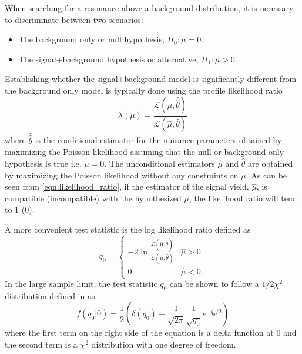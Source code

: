 When searching for a resonance above a background distribution, it is 
necessary to discriminate between two scenarios:
\begin{itemize}
    \item The background only or null hypothesis, $H_{0}: \mu = 0$.
    \item The signal+background hypothesis or alternative, $H_{1}: \mu > 0$.
\end{itemize}
Establishing whether the signal+background model is significantly different 
from the background only model is typically done using the profile likelihood
ratio
\begin{equation}
    \lambda(\mu) = \frac{\mathcal{L}(\mu, \hat{\hat{\theta}})}{\mathcal{L}(\hat{\mu}, \hat{\theta})}
    \label{eqn:likelihood_ratio}
\end{equation}
where $\hat{\hat{\theta}}$ is the conditional estimator for the nuisance parameters 
obtained by maximizing the Poisson likelihood assuming that the null or 
background only hypothesis is true i.e. $\mu = 0$. The unconditional estimators $\hat{\mu}$ 
and $\hat{\theta}$ are obtained by maximizing the Poisson likelihood without
any constraints on $\mu$.
As can be seen from \ref{eqn:likelihood_ratio}, 
if the estimator of the signal yield, $\hat{\mu}$, is compatible (incompatible)
with the hypothesized $\mu$, the likelihood ratio will tend to 1 (0).

A more convenient test statistic is the log likelihood ratio defined as
\begin{equation}
    q_0 = \begin{cases}
            -2 \ln \frac{\mathcal{L}(0, \hat{\hat{\theta}})}{\mathcal{L}(\hat{\mu}, \hat{\theta})} 
            & \hat{\mu} > 0 \\
             0  & \hat{\mu} < 0.
        \end{cases}
\end{equation}
In the large sample limit, the test statistic
$q_0$ can be shown to follow a $1/2\chi^2$ distribution defined in \cite{Cowan:2010js} as 
\begin{equation}
    f(q_{0}|0) = \frac{1}{2} \left(\delta(q_{0}) + \frac{1}{\sqrt{2\pi}}\frac{1}{\sqrt{q_{0}}}e^{-q_0/2} \right)
    \label{eqn:half_chi}
\end{equation}
where the first term on the right side of the equation is a delta function at 0
and the second term is a $\chi^2$ distribution with one degree of freedom. 

